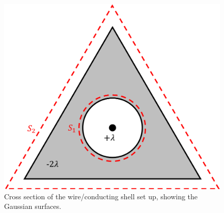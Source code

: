 \begin{framed}
\begin{figure}[!htbp]
\centering
\includegraphics[width=0.4\linewidth]{files/coaxial_triangle_sid-52bfd62b5da7465dab59e3bae2b2561e.png}
\caption[]{Cross section of the wire/conducting shell set up, showing the Gaussian surfaces.}
\label{fig:gauss:coaxial_triangle_side}
\end{figure}
\end{framed}